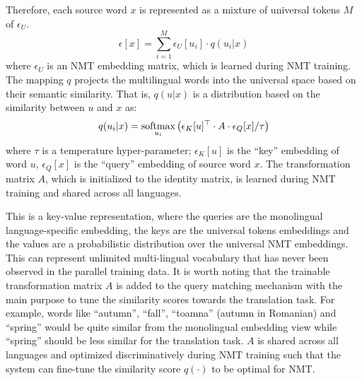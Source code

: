 Therefore, each source word  $x$ is represented as a mixture of universal tokens $M$ of $\epsilon_U$.
\begin{equation}
	\epsilon[x] = \sum_{i=1}^M \epsilon_U\left[u_i\right] \cdot q(u_i|x)
    \label{cp5.eq.universal_embed}
\end{equation}
where $\epsilon_U$ is an NMT embedding matrix, which is learned during NMT training.
The mapping $q$ projects the multilingual words into the universal space based on their semantic similarity. That is, $q(u|x)$ is a distribution based on the similarity between $u$ and $x$ as:
\begin{equation}
 q(u_i|x) = \ssoftmax_{u_i}\left(\epsilon_K[u]^\top \cdot A \cdot \epsilon_Q[x] / \tau \right) %
 \label{cp5.eq.q_softmax}
\end{equation}
where $\tau$ is a temperature hyper-parameter; %
$\epsilon_K[u]$ is the ``key'' embedding of word $u$, $\epsilon_Q[x]$ is the ``query'' embedding of source word $x$.  The transformation matrix $A$, which is initialized to the identity matrix, is learned during NMT training and shared across all languages. 

This is a key-value representation, where the queries  are the monolingual language-specific embedding, the keys are the universal tokens embeddings and the values are a probabilistic distribution over the universal NMT embeddings. 
This can  represent  unlimited  multi-lingual vocabulary  that has  never been observed in the parallel training data.   
It is worth noting  that the trainable transformation matrix $A$ is added  to the query matching mechanism  with the main purpose to tune the similarity scores towards the translation task. For example, words like “autumn”, “fall”, “toamna” (autumn in Romanian)  and  “spring” would be quite similar from the monolingual embedding view while  “spring” should be less similar for the translation  task. 
$A$ is shared across all languages and optimized discriminatively during NMT training such that the system can fine-tune the similarity score $q(\cdot)$ to be optimal for NMT.

